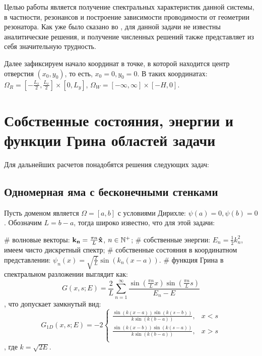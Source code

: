 Целью работы является получение спектральных характеристик данной системы, в частности, резонансов и построение зависимости проводимости от геометрии резонатора. Как уже было сказано во , для данной задачи не известны аналитические решения, и получение численных решений также представляет из себя значительную трудность.

Далее зафиксируем начало координат в точке, в которой находится центр отверстия $(x_0, y_0)$, то есть, $x_0 = 0, y_0 = 0$. В таких координатах: $\Omega_R = [- \frac{L_x}{2}, \frac{L_x}{2}] \times [0, L_y]$, $\Omega_W = [-\infty, \infty] \times [-H, 0]$.

\section{Собственные состояния, энергии и функции Грина областей задачи}
Для дальнейших расчетов понадобятся решения следующих задач:

\subsection{Одномерная яма с бесконечными стенками}
Пусть доменом является $\Omega = [a, b]$ с условиями Дирихле: $\psi(a) = 0, \psi(b) = 0$. Обозначим $L = b - a$, тогда широко известно, что для этой задачи:
\begin{ilist}
# волновые векторы: $\vb{k_n} = \frac{\pi n}{L} \vb{\hat{x}}$, $n \in \mathbb{N}^+$;
# собственные энергии: $E_n = \frac{1}{2} k_n^2$, имеем чисто дискретный спектр;
# собственные состояния в координатном представлении: $\psi_n(x) = \sqrt{\frac{2}{L}} \sin(k_n (x - a))$.
# функция Грина в спектральном разложении выглядит как:
\[
G(x, s; E) = \frac{2}{L} \sum\limits_{n = 1}^\infty \frac{\sin(\frac{\pi n}{L} x) \sin(\frac{\pi n}{L} s)}{E_n - E}
\]
, что допускает замкнутый вид:
\[
G_{1D}(x, s; E) = - 2 \begin{cases}
\frac{\sin(k(x - a)) \sin(k(s - b))}{k \sin(k(b - a))}, & x < s \\
\frac{\sin(k(x - b)) \sin(k(s - a))}{k \sin(k(b - a))}, & x > s \\
\end{cases}
\]
, где $k = \sqrt{2 E}$.
\end{ilist}


